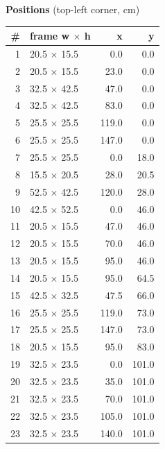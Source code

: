 \documentclass[a4paper,landscape,10pt]{article}
\begin{document}
\begin{minipage}[t]{0.25\textwidth}
\vspace{8pt}
{\bfseries Positions} (top-left corner, cm)\\[2pt]
\tiny
\begin{tabular}{@{}r l r r@{}}
\toprule
\# & frame w $\times$ h & x & y \\
\midrule
1 & 20.5 $\times$ 15.5 & 0.0 & 0.0 \\
2 & 20.5 $\times$ 15.5 & 23.0 & 0.0 \\
3 & 32.5 $\times$ 42.5 & 47.0 & 0.0 \\
4 & 32.5 $\times$ 42.5 & 83.0 & 0.0 \\
5 & 25.5 $\times$ 25.5 & 119.0 & 0.0 \\
6 & 25.5 $\times$ 25.5 & 147.0 & 0.0 \\
7 & 25.5 $\times$ 25.5 & 0.0 & 18.0 \\
8 & 15.5 $\times$ 20.5 & 28.0 & 20.5 \\
9 & 52.5 $\times$ 42.5 & 120.0 & 28.0 \\
10 & 42.5 $\times$ 52.5 & 0.0 & 46.0 \\
11 & 20.5 $\times$ 15.5 & 47.0 & 46.0 \\
12 & 20.5 $\times$ 15.5 & 70.0 & 46.0 \\
13 & 20.5 $\times$ 15.5 & 95.0 & 46.0 \\
14 & 20.5 $\times$ 15.5 & 95.0 & 64.5 \\
15 & 42.5 $\times$ 32.5 & 47.5 & 66.0 \\
16 & 25.5 $\times$ 25.5 & 119.0 & 73.0 \\
17 & 25.5 $\times$ 25.5 & 147.0 & 73.0 \\
18 & 20.5 $\times$ 15.5 & 95.0 & 83.0 \\
19 & 32.5 $\times$ 23.5 & 0.0 & 101.0 \\
20 & 32.5 $\times$ 23.5 & 35.0 & 101.0 \\
21 & 32.5 $\times$ 23.5 & 70.0 & 101.0 \\
22 & 32.5 $\times$ 23.5 & 105.0 & 101.0 \\
23 & 32.5 $\times$ 23.5 & 140.0 & 101.0 \\
\bottomrule
\end{tabular}
\end{minipage}
\clearpage
\end{document}
